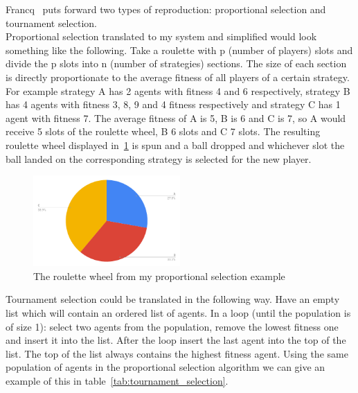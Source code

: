 \documentclass[]{final_report}
\begin{document}
Francq~\cite{genetic_algorithms} puts forward two types of reproduction: proportional selection and tournament selection.\\
Proportional selection translated to my system and simplified would look something like the following. Take a roulette with p (number of players) slots and divide the p slots into n (number of strategies) sections. The size of each section is directly proportionate to the average fitness of all players of a certain strategy. For example strategy A has 2 agents with fitness 4 and 6 respectively, strategy B has 4 agents with fitness 3, 8, 9 and 4 fitness respectively and strategy C has 1 agent with fitness 7. The average fitness of A is 5, B is 6 and C is 7, so A would receive 5 slots of the roulette wheel, B 6 slots and C 7 slots. The resulting roulette wheel displayed in~\ref{fig:roulette_wheel} is spun and a ball dropped and whichever slot the ball landed on the corresponding strategy is selected for the new player.\\
\begin{figure}
	\begin{center}
	\includegraphics[width=0.5\textwidth]{reproduction_chart.png}
	\caption{The roulette wheel from my proportional selection example}
	\label{fig:roulette_wheel}
	\end{center}
\end{figure}
Tournament selection could be translated in the following way. Have an empty list which will contain an ordered list of agents. In a loop (until the population is of size 1): select two agents from the population, remove the lowest fitness one and insert it into the list. After the loop insert the last agent into the top of the list. The top of the list always contains the highest fitness agent. Using the same population of agents in the proportional selection algorithm we can give an example of this in table~\ref{tab:tournament_selection}.
\end{document}
